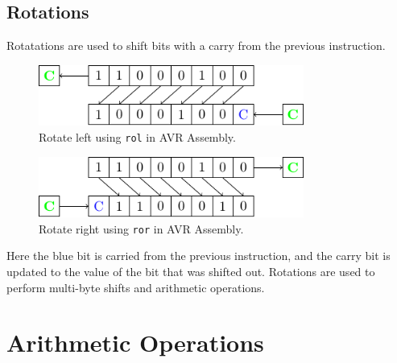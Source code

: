 \documentclass{report}
\begin{document}
\subsection{Rotations}
Rotatations are used to shift bits with a carry from the previous instruction.
\begin{figure}[H]
    \centering
    \includegraphics[height = 2cm, keepaspectratio = true]{figures/rotate_left.pdf}
    \caption{Rotate left using \texttt{rol} in AVR Assembly.} %
\end{figure}
\begin{figure}[H]
    \centering
    \includegraphics[height = 2cm, keepaspectratio = true]{figures/rotate_right.pdf}
    \caption{Rotate right using \texttt{ror} in AVR Assembly.} %
\end{figure}
Here the blue bit is carried from the previous instruction, and the carry bit is updated
to the value of the bit that was shifted out.
Rotations are used to perform multi-byte shifts and arithmetic operations.
\section{Arithmetic Operations}
\end{document}
